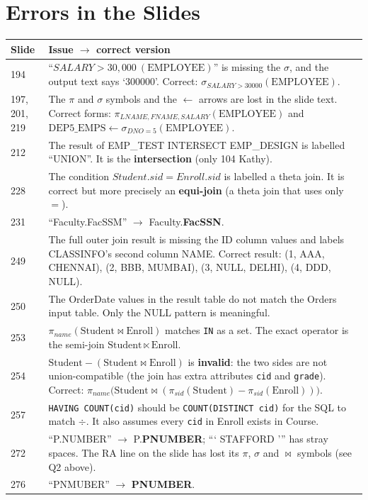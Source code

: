 \documentclass[10pt,a4paper]{article}
\newcommand{\R}[1]{\mathrm{#1}}          %
\begin{document}
\section{Errors in the Slides}

\begin{warnbox}[Corrections]
\small
\begin{tabularx}{\linewidth}{@{}l X@{}}
\toprule
\textbf{Slide} & \textbf{Issue $\to$ correct version}\\\midrule
194 & ``$SALARY > 30{,}000\ (\R{EMPLOYEE})$'' is missing the $\sigma$, and the output text says `300000'. Correct: $\sigma_{SALARY>30000}(\R{EMPLOYEE})$.\\
197, 201, 219 & The $\pi$ and $\sigma$ symbols and the $\leftarrow$ arrows are lost in the slide text. Correct forms: $\pi_{LNAME,FNAME,SALARY}(\R{EMPLOYEE})$ and $\R{DEP5\_EMPS} \leftarrow \sigma_{DNO=5}(\R{EMPLOYEE})$.\\
212 & The result of EMP\_TEST INTERSECT EMP\_DESIGN is labelled ``UNION''. It is the \textbf{intersection} (only 104 Kathy).\\
228 & The condition $Student.sid = Enroll.sid$ is labelled a theta join. It is correct but more precisely an \textbf{equi-join} (a theta join that uses only $=$).\\
231 & ``Faculty.FacSSM'' $\to$ Faculty.\textbf{FacSSN}.\\
249 & The full outer join result is missing the ID column values and labels CLASSINFO's second column NAME. Correct result: (1, AAA, CHENNAI), (2, BBB, MUMBAI), (3, NULL, DELHI), (4, DDD, NULL).\\
250 & The OrderDate values in the result table do not match the Orders input table. Only the NULL pattern is meaningful.\\
253 & $\pi_{name}(\R{Student} \bowtie \R{Enroll})$ matches \texttt{IN} as a set. The exact operator is the semi-join $\R{Student} \ltimes \R{Enroll}$.\\
254 & $\R{Student} - (\R{Student} \bowtie \R{Enroll})$ is \textbf{invalid}: the two sides are not union-compatible (the join has extra attributes \texttt{cid} and \texttt{grade}). Correct: $\pi_{name}\big(\R{Student} \bowtie (\pi_{sid}(\R{Student}) - \pi_{sid}(\R{Enroll}))\big)$.\\
257 & \texttt{HAVING COUNT(cid)} should be \texttt{COUNT(DISTINCT cid)} for the SQL to match $\div$. It also assumes every \texttt{cid} in Enroll exists in Course.\\
272 & ``P.NUMBER'' $\to$ P.\textbf{PNUMBER}; ``‘ STAFFORD ’'' has stray spaces. The RA line on the slide has lost its $\pi$, $\sigma$ and $\bowtie$ symbols (see Q2 above).\\
276 & ``PNMUBER'' $\to$ \textbf{PNUMBER}.\\
\bottomrule
\end{tabularx}
\end{warnbox}
\end{document}
